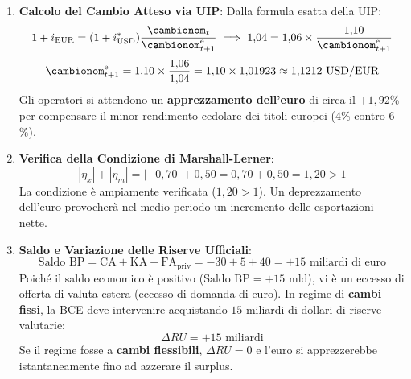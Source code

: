 \begin{esercizio}
\begin{enumerate}
    \item \textbf{Calcolo del Cambio Atteso via UIP}:
    Dalla formula esatta della UIP:
    \begin{equation*}
        1 + i_{\text{EUR}} = (1 + i_{\text{USD}}^*) \frac{\cambionom_t}{\cambionom_{t+1}^{\mathrm{e}}} \implies 1{,}04 = 1{,}06 \times \frac{1{,}10}{\cambionom_{t+1}^{\mathrm{e}}}
    \end{equation*}
    \begin{equation*}
        \cambionom_{t+1}^{\mathrm{e}} = 1{,}10 \times \frac{1{,}06}{1{,}04} = 1{,}10 \times 1{,}01923 \approx 1{,}1212 \text{ USD/EUR}
    \end{equation*}
    Gli operatori si attendono un \textbf{apprezzamento dell'euro} di circa il $+1{,}92$\% per compensare il minor rendimento cedolare dei titoli europei ($4$\% contro $6$\%).

    \item \textbf{Verifica della Condizione di Marshall-Lerner}:
    \begin{equation*}
        |\eta_x| + |\eta_m| = |-0{,}70| + 0{,}50 = 0{,}70 + 0{,}50 = 1{,}20 > 1
    \end{equation*}
    La condizione è ampiamente verificata ($1{,}20 > 1$). Un deprezzamento dell'euro provocherà nel medio periodo un incremento delle esportazioni nette.

    \item \textbf{Saldo e Variazione delle Riserve Ufficiali}:
    \begin{equation*}
        \text{Saldo BP} = \mathrm{CA} + \mathrm{KA} + \mathrm{FA}_{\text{priv}} = -30 + 5 + 40 = +15\text{ miliardi di euro}
    \end{equation*}
    Poiché il saldo economico è positivo ($\text{Saldo BP} = +15\text{ mld}$), vi è un eccesso di offerta di valuta estera (eccesso di domanda di euro).
    In regime di \textbf{cambi fissi}, la BCE deve intervenire acquistando $15$ miliardi di dollari di riserve valutarie:
    \begin{equation*}
        \Delta RU = +15\text{ miliardi}
    \end{equation*}
    Se il regime fosse a \textbf{cambi flessibili}, $\Delta RU = 0$ e l'euro si apprezzerebbe istantaneamente fino ad azzerare il surplus.
\end{enumerate}
\end{esercizio}

